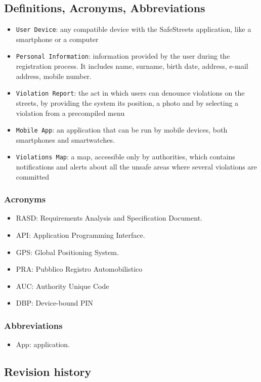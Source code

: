 \documentclass[12pt,a4paper]{article}
\begin{document}
\subsection{Definitions, Acronyms, Abbreviations}
			\begin{itemize}
				\item \texttt{User Device}: any compatible device with the SafeStreets application, like a smartphone or a computer
				\item \texttt{Personal Information}: information provided by the user during the registration process. It includes name, surname, birth date, address, e-mail address, mobile number.
				\item \texttt{Violation Report}: the act in which users can denounce violations on the streets, by providing the system its position, a photo and by selecting a violation from a precompiled menu
				\item \texttt{Mobile App}: an application that can be run by mobile devices, both smartphones and smartwatches.
				\item \texttt{Violations Map}: a map, accessible only by authorities, which contains notifications and alerts about all the unsafe areas where several violations are committed
			\end{itemize}
		\subsubsection{Acronyms}
			\begin{itemize}
				\item RASD: Requirements Analysis and Specification Document.
				\item API: Application Programming Interface.
				\item GPS: Global Positioning System.
				\item PRA: Pubblico Registro Automobilistico
				\item AUC: Authority Unique Code
				\item DBP: Device-bound PIN
			\end{itemize}
		\subsubsection{Abbreviations}
			\begin{itemize}
				\item {App}: application.
			\end{itemize}
\subsection{Revision history} 
\newpage
\end{document}
